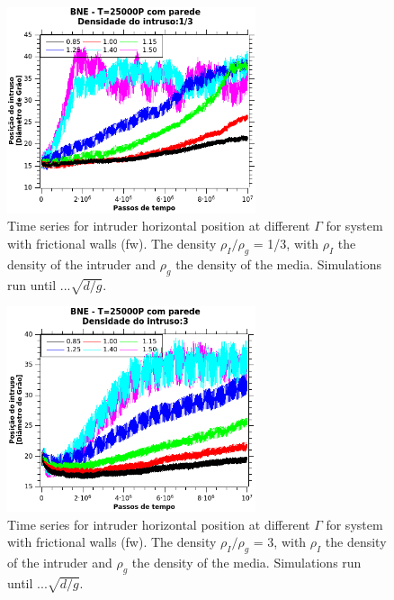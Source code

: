 \begin{figure}
    \centering
    \includegraphics[width=0.65\textwidth]{04-figuras/BNE25000D1-3.png}
    \caption[BNE with frictional walls: $\rho_I/\rho_g$ = 1/3.]{Time series for intruder horizontal position at different $\Gamma$ for system with frictional walls (fw). The density $\rho_I/\rho_g$ = 1/3, with $\rho_I$ the density of the intruder and $\rho_g$ the density of the media. Simulations run until $...\sqrt{d/g}$.}
    \label{fig:BNE25000_Parede_Densidade1-3}
\end{figure}

\begin{figure}
    \centering
    \includegraphics[width=0.65\textwidth]{04-figuras/BNE25000D3.png}
    \caption[BNE with frictional walls: $\rho_I/\rho_g$ = 1.]{Time series for intruder horizontal position at different $\Gamma$ for system with frictional walls (fw). The density $\rho_I/\rho_g$ = 3, with $\rho_I$ the density of the intruder and $\rho_g$ the density of the media. Simulations run until $...\sqrt{d/g}$.}
    \label{fig:BNE25000_Parede_Densidade3}
\end{figure}



